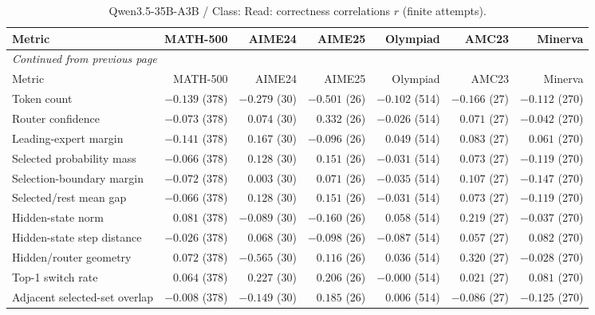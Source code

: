 \begingroup\scriptsize\setlength{\tabcolsep}{4pt}
\begin{longtable}{@{}lrrrrrr@{}}
\caption{Qwen3.5-35B-A3B / Class: Read: correctness correlations $r$ (finite attempts).}\label{tab:multi-qwen-class-Read}\\
\toprule
Metric & MATH-500 & AIME24 & AIME25 & Olympiad & AMC23 & Minerva \\
\midrule\endfirsthead
\multicolumn{7}{l}{\textit{Continued from previous page}}\\
\toprule
Metric & MATH-500 & AIME24 & AIME25 & Olympiad & AMC23 & Minerva \\
\midrule\endhead
\bottomrule\endfoot
Token count & $-0.139$ (378) & $-0.279$ (30) & $-0.501$ (26) & $-0.102$ (514) & $-0.166$ (27) & $-0.112$ (270) \\
Router confidence & $-0.073$ (378) & $0.074$ (30) & $0.332$ (26) & $-0.026$ (514) & $0.071$ (27) & $-0.042$ (270) \\
Leading-expert margin & $-0.141$ (378) & $0.167$ (30) & $-0.096$ (26) & $0.049$ (514) & $0.083$ (27) & $0.061$ (270) \\
Selected probability mass & $-0.066$ (378) & $0.128$ (30) & $0.151$ (26) & $-0.031$ (514) & $0.073$ (27) & $-0.119$ (270) \\
Selection-boundary margin & $-0.072$ (378) & $0.003$ (30) & $0.071$ (26) & $-0.035$ (514) & $0.107$ (27) & $-0.147$ (270) \\
Selected/rest mean gap & $-0.066$ (378) & $0.128$ (30) & $0.151$ (26) & $-0.031$ (514) & $0.073$ (27) & $-0.119$ (270) \\
Hidden-state norm & $0.081$ (378) & $-0.089$ (30) & $-0.160$ (26) & $0.058$ (514) & $0.219$ (27) & $-0.037$ (270) \\
Hidden-state step distance & $-0.026$ (378) & $0.068$ (30) & $-0.098$ (26) & $-0.087$ (514) & $0.057$ (27) & $0.082$ (270) \\
Hidden/router geometry & $0.072$ (378) & $-0.565$ (30) & $0.116$ (26) & $0.036$ (514) & $0.320$ (27) & $-0.028$ (270) \\
Top-1 switch rate & $0.064$ (378) & $0.227$ (30) & $0.206$ (26) & $-0.000$ (514) & $0.021$ (27) & $0.081$ (270) \\
Adjacent selected-set overlap & $-0.008$ (378) & $-0.149$ (30) & $0.185$ (26) & $0.006$ (514) & $-0.086$ (27) & $-0.125$ (270) \\
\end{longtable}\endgroup

